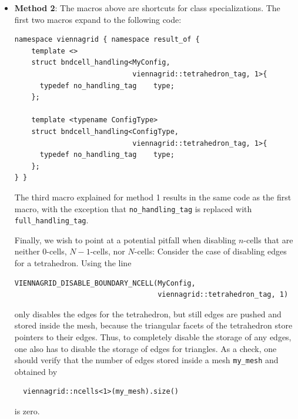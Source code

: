 \begin{itemize}
 \item \textbf{Method 2}: The macros above are shortcuts for class specializations. The first two macros expand to the following code:
\begin{lstlisting}
namespace viennagrid { namespace result_of {
    template <>
    struct bndcell_handling<MyConfig,
                            viennagrid::tetrahedron_tag, 1>{
      typedef no_handling_tag    type;
    };

    template <typename ConfigType>
    struct bndcell_handling<ConfigType,
                            viennagrid::tetrahedron_tag, 1>{
      typedef no_handling_tag    type;
    };
} }
\end{lstlisting}
The third macro explained for method 1 results in the same code as the first macro, with the exception that \lstinline|no_handling_tag| is replaced with \lstinline|full_handling_tag|.

Finally, we wish to point at a potential pitfall when disabling $n$-cells that are neither $0$-cells, $N-1$-cells, nor $N$-cells: Consider the case of disabling edges for a tetrahedron. Using the line
  \begin{lstlisting}
VIENNAGRID_DISABLE_BOUNDARY_NCELL(MyConfig,
                                  viennagrid::tetrahedron_tag, 1)
  \end{lstlisting}
only disables the edges for the tetrahedron, but still edges are pushed and stored inside the mesh, because the triangular facets of the tetrahedron store pointers to their edges. Thus, to completely disable the storage of any edges, one also has to disable the storage of edges for triangles. As a check, one should verify that the number of edges stored inside a mesh \lstinline|my_mesh| and obtained by 
 \begin{lstlisting}
  viennagrid::ncells<1>(my_mesh).size()
 \end{lstlisting}
is zero.



\end{itemize}
